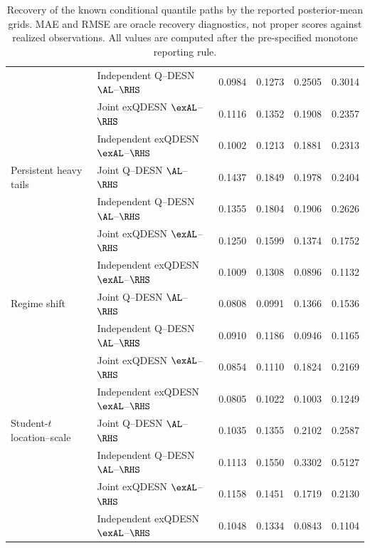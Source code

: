 \begin{table}[p]
{\begin{tabular}{@{}>{\raggedright\arraybackslash}p{}>{\raggedright\arraybackslash}p{}rrrr@{}}
 & Independent Q--DESN \(\AL\)--\(\RHS\) & 0.0984 & 0.1273 & 0.2505 & 0.3014 \\
 & Joint exQDESN \(\exAL\)--\(\RHS\) & 0.1116 & 0.1352 & 0.1908 & 0.2357 \\
 & Independent exQDESN \(\exAL\)--\(\RHS\) & 0.1002 & 0.1213 & 0.1881 & 0.2313 \\
\addlinespace[2pt]
Persistent heavy tails & Joint Q--DESN \(\AL\)--\(\RHS\) & 0.1437 & 0.1849 & 0.1978 & 0.2404 \\
 & Independent Q--DESN \(\AL\)--\(\RHS\) & 0.1355 & 0.1804 & 0.1906 & 0.2626 \\
 & Joint exQDESN \(\exAL\)--\(\RHS\) & 0.1250 & 0.1599 & 0.1374 & 0.1752 \\
 & Independent exQDESN \(\exAL\)--\(\RHS\) & 0.1009 & 0.1308 & 0.0896 & 0.1132 \\
\addlinespace[2pt]
Regime shift & Joint Q--DESN \(\AL\)--\(\RHS\) & 0.0808 & 0.0991 & 0.1366 & 0.1536 \\
 & Independent Q--DESN \(\AL\)--\(\RHS\) & 0.0910 & 0.1186 & 0.0946 & 0.1165 \\
 & Joint exQDESN \(\exAL\)--\(\RHS\) & 0.0854 & 0.1110 & 0.1824 & 0.2169 \\
 & Independent exQDESN \(\exAL\)--\(\RHS\) & 0.0805 & 0.1022 & 0.1003 & 0.1249 \\
\addlinespace[2pt]
Student-\(t\) location--scale & Joint Q--DESN \(\AL\)--\(\RHS\) & 0.1035 & 0.1355 & 0.2102 & 0.2587 \\
 & Independent Q--DESN \(\AL\)--\(\RHS\) & 0.1113 & 0.1550 & 0.3302 & 0.5127 \\
 & Joint exQDESN \(\exAL\)--\(\RHS\) & 0.1158 & 0.1451 & 0.1719 & 0.2130 \\
 & Independent exQDESN \(\exAL\)--\(\RHS\) & 0.1048 & 0.1334 & 0.0843 & 0.1104 \\
\bottomrule
\end{tabular}
}%
\caption{Recovery of the known conditional quantile paths by the reported posterior-mean grids. MAE and RMSE are oracle recovery diagnostics, not proper scores against realized observations. All values are computed after the pre-specified monotone reporting rule.}
\label{qdesn:tab:supp-joint-qdesn-corrected-v4-oracle}
\end{table}
